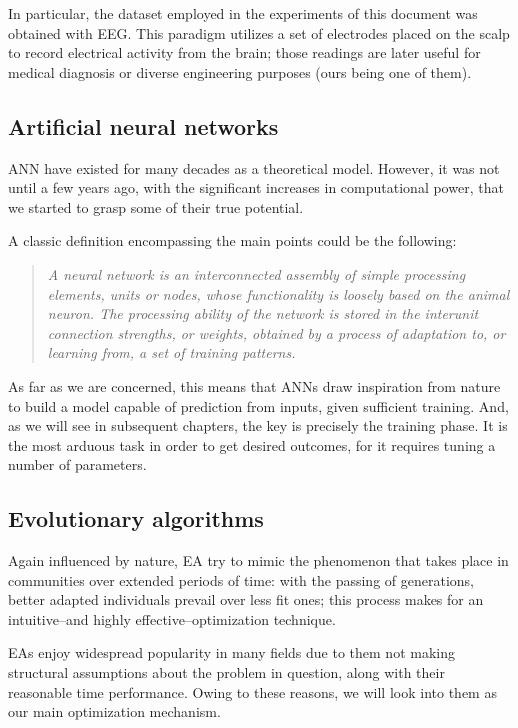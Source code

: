 		In particular, the dataset employed in the experiments of this document was obtained with \acs{EEG}. This paradigm utilizes a set of electrodes placed on the scalp to record electrical activity from the brain; those readings are later useful for medical diagnosis or diverse engineering purposes (ours being one of them).

	\subsection{Artificial neural networks}

		\ac{ANN} have existed for many decades as a theoretical model. However, it was not until a few years ago, with the significant increases in computational power, that we started to grasp some of their true potential.

		A classic definition encompassing the main points could be the following: 

		\begin{quotation}
			\textit{A neural network is an interconnected assembly of simple processing elements, units or nodes, whose functionality is loosely based on the animal neuron. The processing ability of the network is stored in the interunit connection strengths, or weights, obtained by a process of adaptation to, or learning from, a set of training patterns. \cite{nnintro}}
		\end{quotation}

		As far as we are concerned, this means that \acs{ANN}s draw inspiration from nature to build a model capable of prediction from inputs, given sufficient training. And, as we will see in subsequent chapters, the key is precisely the training phase. It is the most arduous task in order to get desired outcomes, for it requires tuning a number of parameters.

	\subsection{Evolutionary algorithms}

		Again influenced by nature, \ac{EA} try to mimic the phenomenon that takes place in communities over extended periods of time: with the passing of generations, better adapted individuals prevail over less fit ones; this process makes for an intuitive--and highly effective--optimization technique.

		\acs{EA}s enjoy widespread popularity in many fields due to them not making structural assumptions about the problem in question, along with their reasonable time performance. Owing to these reasons, we will look into them as our main optimization mechanism.